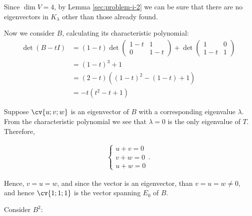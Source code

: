 \documentclass[11pt]{scrartcl}
\begin{document}
\begin{soln}



Since $\dim V = 4$, by Lemma \ref{sec:problem-i-2} we can be sure that
there are no eigenvectors in $K_{\lambda}$ other than those already
found.

Now we consider $B$, calculating its characteristic polynomial:
\begin{align}
  \det(B-tI)               & = (1-t)\det 
               \begin{pmatrix}
                 1-t       & 1                        \\
                 0         & 1-t
               \end{pmatrix} + \det 
                     \begin{pmatrix}
                       1   & 0                        \\
                       1-t & 1
                     \end{pmatrix}                    \\
                           & = (1-t)^3+ 1             \\
                           & = (2-t)((1-t)^2-(1-t)+1) \\
                           & =-t(t^2-t+1)
\end{align}

Suppose $\cv{u;v;w}$ is an eigenvector of $B$ with a corresponding
eigenvalue $\lambda$. From the characteristic polynomial we see that
$\lambda = 0$ is the only eigenvalue of $T$. Therefore,

\begin{align}
  \begin{cases}
    u+v = 0\\
    v+w = 0\\
    u+w = 0
  \end{cases}.
\end{align}

Hence, $v=u=w$, and since the vector is an eigenvector, than
$v = u=w\neq 0$, and hence $\cv{1;1;1}$ is the vector spanning $E_0$ of $B$.

Consider $B^2$:


\end{soln}
\end{document}
